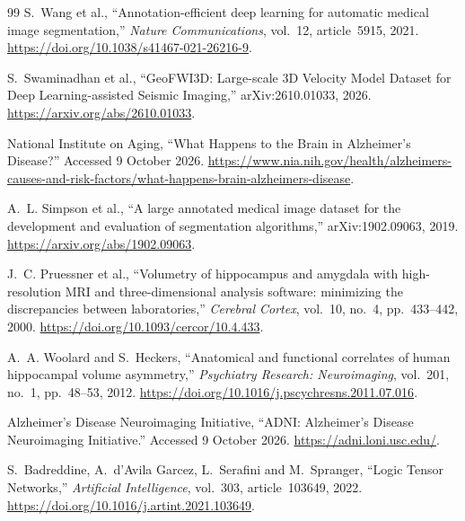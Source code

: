 \documentclass[12pt,a4paper]{article}
\begin{document}
\clearpage

\renewcommand{\refname}{Bibliography}
{}
\begin{thebibliography}{99}
S.~Wang et al., ``Annotation-efficient deep learning for automatic medical
image segmentation,'' \emph{Nature Communications}, vol.~12, article~5915,
2021. \url{https://doi.org/10.1038/s41467-021-26216-9}.

S.~Swaminadhan et al., ``GeoFWI3D: Large-scale 3D Velocity Model Dataset for
Deep Learning-assisted Seismic Imaging,'' arXiv:2610.01033, 2026.
\url{https://arxiv.org/abs/2610.01033}.

National Institute on Aging, ``What Happens to the Brain in Alzheimer's
Disease?'' Accessed 9 October 2026.
\url{https://www.nia.nih.gov/health/alzheimers-causes-and-risk-factors/what-happens-brain-alzheimers-disease}.

A.~L. Simpson et al., ``A large annotated medical image dataset for the
development and evaluation of segmentation algorithms,'' arXiv:1902.09063,
2019. \url{https://arxiv.org/abs/1902.09063}.

J.~C. Pruessner et al., ``Volumetry of hippocampus and amygdala with
high-resolution MRI and three-dimensional analysis software: minimizing
the discrepancies between laboratories,'' \emph{Cerebral Cortex},
vol.~10, no.~4, pp.~433--442, 2000.
\url{https://doi.org/10.1093/cercor/10.4.433}.

A.~A. Woolard and S.~Heckers, ``Anatomical and functional correlates of
human hippocampal volume asymmetry,'' \emph{Psychiatry Research:
Neuroimaging}, vol.~201, no.~1, pp.~48--53, 2012.
\url{https://doi.org/10.1016/j.pscychresns.2011.07.016}.

Alzheimer's Disease Neuroimaging Initiative, ``ADNI: Alzheimer's Disease
Neuroimaging Initiative.'' Accessed 9 October 2026.
\url{https://adni.loni.usc.edu/}.

S.~Badreddine, A.~d'Avila Garcez, L.~Serafini and M.~Spranger,
``Logic Tensor Networks,'' \emph{Artificial Intelligence}, vol.~303,
article~103649, 2022.
\url{https://doi.org/10.1016/j.artint.2021.103649}.


\end{thebibliography}
\end{document}
